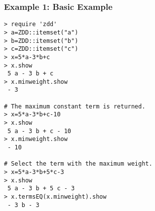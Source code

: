 \subsubsection*{Example 1: Basic Example}



\begin{Verbatim}[baselinestretch=0.7,frame=single]
> require 'zdd'
> a=ZDD::itemset("a")
> b=ZDD::itemset("b")
> c=ZDD::itemset("c")
> x=5*a-3*b+c
> x.show
 5 a - 3 b + c
> x.minweight.show
 - 3

# The maximum constant term is returned. 
> x=5*a-3*b+c-10
> x.show
 5 a - 3 b + c - 10
> x.minweight.show
 - 10

# Select the term with the maximum weight.
> x=5*a-3*b+5*c-3
> x.show
 5 a - 3 b + 5 c - 3
> x.termsEQ(x.minweight).show
 - 3 b - 3
\end{Verbatim}
